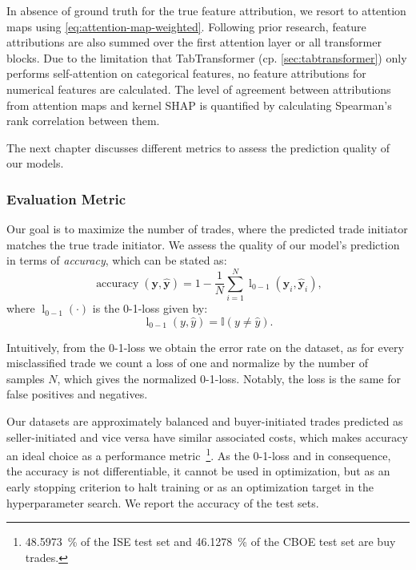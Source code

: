 In absence of ground truth for the true feature attribution, we resort to attention maps using \cref{eq:attention-map-weighted}. Following prior research, feature attributions are also summed over the first attention layer or all transformer blocks. Due to the limitation that TabTransformer (cp. \cref{sec:tabtransformer}) only performs self-attention on categorical features, no feature attributions for numerical features are calculated. The level of agreement between attributions from attention maps and kernel \gls{SHAP} is quantified by calculating Spearman's rank correlation between them.

The next chapter discusses different metrics to assess the prediction quality of our models.

\subsubsection{Evaluation Metric}\label{sec:evaluation-metric}

Our goal is to maximize the number of trades, where the predicted trade initiator matches the true trade initiator. We assess the quality of our model’s prediction in terms of \emph{accuracy}, which can be stated as:
\begin{equation}
\operatorname{accuracy}(\mathbf{y}, \widehat{\mathbf{y}}) = 1 - \frac{1}{N}\sum_{i=1}^{N} \operatorname{l}_{0-1}(\mathbf{y}_i, \widehat{\mathbf{y}}_i),
\end{equation}
where $\operatorname{l}_{0-1}(\cdot)$ is the 0-1-loss given by:
\begin{equation}
    \operatorname{l}_{0-1}(y, \widehat{y}) = \mathbb{I}\left(y\neq \widehat{y}\right).
\end{equation}

Intuitively, from the 0-1-loss we obtain the error rate on the dataset, as for every misclassified trade we count a loss of one and normalize by the number of samples $N$, which gives the normalized 0-1-loss. Notably, the loss is the same for false positives and negatives.

Our datasets are approximately balanced and buyer-initiated trades predicted as seller-initiated and vice versa have similar associated costs, which makes accuracy an ideal choice as a performance metric~\footnote{\SI{48.5973}{\percent} of the \gls{ISE} test set and \SI{46.1278}{\percent} of the \gls{CBOE} test set are buy trades.}. As the 0-1-loss and in consequence, the accuracy is not differentiable, it cannot be used in optimization, but as an early stopping criterion to halt training or as an optimization target in the hyperparameter search. We report the accuracy of the test sets.

